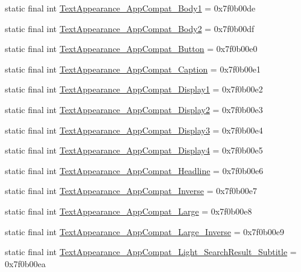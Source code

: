 \begin{CompactItemize}
\item 
static final int \hyperlink{classandroid_1_1support_1_1v4_1_1_r_1_1style_48774ddcf3ff2569bed16a0390cdc31c}{TextAppearance\_\-AppCompat\_\-Body1} = 0x7f0b00de
\item 
static final int \hyperlink{classandroid_1_1support_1_1v4_1_1_r_1_1style_dab374ed8194961f45321b7bed5de8f4}{TextAppearance\_\-AppCompat\_\-Body2} = 0x7f0b00df
\item 
static final int \hyperlink{classandroid_1_1support_1_1v4_1_1_r_1_1style_78337a67e2eba43fe49d28eadc67ed12}{TextAppearance\_\-AppCompat\_\-Button} = 0x7f0b00e0
\item 
static final int \hyperlink{classandroid_1_1support_1_1v4_1_1_r_1_1style_72b2ac2fc6a84d8a8d99eba7d1c2dbca}{TextAppearance\_\-AppCompat\_\-Caption} = 0x7f0b00e1
\item 
static final int \hyperlink{classandroid_1_1support_1_1v4_1_1_r_1_1style_7251452a2b52773779ef25a5ea02d062}{TextAppearance\_\-AppCompat\_\-Display1} = 0x7f0b00e2
\item 
static final int \hyperlink{classandroid_1_1support_1_1v4_1_1_r_1_1style_0320eac66ab8430976cbb2bf969df642}{TextAppearance\_\-AppCompat\_\-Display2} = 0x7f0b00e3
\item 
static final int \hyperlink{classandroid_1_1support_1_1v4_1_1_r_1_1style_8b9d1a42584b64cd734c30ea53a7b74d}{TextAppearance\_\-AppCompat\_\-Display3} = 0x7f0b00e4
\item 
static final int \hyperlink{classandroid_1_1support_1_1v4_1_1_r_1_1style_967009ac0895d54961deeede125f2337}{TextAppearance\_\-AppCompat\_\-Display4} = 0x7f0b00e5
\item 
static final int \hyperlink{classandroid_1_1support_1_1v4_1_1_r_1_1style_9583264187725b637db51b9955899d2c}{TextAppearance\_\-AppCompat\_\-Headline} = 0x7f0b00e6
\item 
static final int \hyperlink{classandroid_1_1support_1_1v4_1_1_r_1_1style_0d57327441f8660d1ff3d77d5dca53fd}{TextAppearance\_\-AppCompat\_\-Inverse} = 0x7f0b00e7
\item 
static final int \hyperlink{classandroid_1_1support_1_1v4_1_1_r_1_1style_7d77a33848c138cb59ac03e88ebbe92d}{TextAppearance\_\-AppCompat\_\-Large} = 0x7f0b00e8
\item 
static final int \hyperlink{classandroid_1_1support_1_1v4_1_1_r_1_1style_f7e1cc3babb2349767eeeae862c27216}{TextAppearance\_\-AppCompat\_\-Large\_\-Inverse} = 0x7f0b00e9
\item 
static final int \hyperlink{classandroid_1_1support_1_1v4_1_1_r_1_1style_6bd147794ecda4d39c9882902ea9ffa4}{TextAppearance\_\-AppCompat\_\-Light\_\-SearchResult\_\-Subtitle} = 0x7f0b00ea

\end{CompactItemize}
